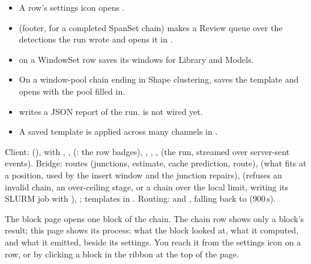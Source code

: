 \begin{itemize}
  \item A row's settings icon opens .
  \item {} (footer, for a completed SpanSet chain) makes a Review queue over
        the detections the run wrote and opens it in .
  \item {} on a WindowSet row saves its windows for Library and Models.
  \item On a window-pool chain ending in Shape clustering,  saves the template and
        opens  with the pool filled in.
  \item {} writes a JSON report of the run.  is not wired yet.
  \item A saved template is applied across many channels in .
\end{itemize}

\begin{underthehood}
Client:  (), with
, ,  (: the row
badges), , , ,
 (the run, streamed over server-sent events). Bridge: 
routes  (junctions, estimate, cache prediction, route),
 (what fits at a position, used by the insert window and the
junction repairs),  (refuses an invalid chain, an over-ceiling stage, or a
chain over the local limit, writing its SLURM job with 
), ; templates in
. Routing: 
 and , falling back to
 (900\,s).
\end{underthehood}

The block page opens one block of the chain. The chain row shows only a block's result; this page
shows its process: what the block looked at, what it computed, and what it emitted, beside its
settings. You reach it from the settings icon on a row, or by clicking a block in the ribbon at the
top of the page.

